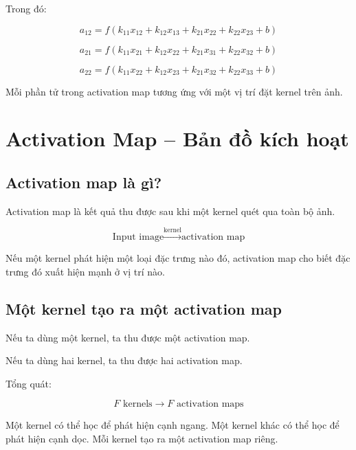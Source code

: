 Trong đó:

\[
    a_{12}
    =
    f(
    k_{11}x_{12}
    +
    k_{12}x_{13}
    +
    k_{21}x_{22}
    +
    k_{22}x_{23}
    +
    b
    )
\]

\[
    a_{21}
    =
    f(
    k_{11}x_{21}
    +
    k_{12}x_{22}
    +
    k_{21}x_{31}
    +
    k_{22}x_{32}
    +
    b
    )
\]

\[
    a_{22}
    =
    f(
    k_{11}x_{22}
    +
    k_{12}x_{23}
    +
    k_{21}x_{32}
    +
    k_{22}x_{33}
    +
    b
    )
\]

\begin{ghinho}
Mỗi phần tử trong activation map tương ứng với một vị trí đặt kernel trên ảnh.
\end{ghinho}

\section{Activation Map -- Bản đồ kích hoạt}

\subsection{Activation map là gì?}

Activation map là kết quả thu được sau khi một kernel quét qua toàn bộ ảnh.

\[
    \text{Input image}
    \xrightarrow{\text{kernel}}
    \text{activation map}
\]

Nếu một kernel phát hiện một loại đặc trưng nào đó, activation map cho biết đặc trưng đó xuất hiện mạnh ở vị trí nào.

\subsection{Một kernel tạo ra một activation map}

Nếu ta dùng một kernel, ta thu được một activation map.

Nếu ta dùng hai kernel, ta thu được hai activation map.

Tổng quát:

\[
    F \text{ kernels}
    \rightarrow
    F \text{ activation maps}
\]

\begin{vidu}
Một kernel có thể học để phát hiện cạnh ngang. Một kernel khác có thể học để phát hiện cạnh dọc. Mỗi kernel tạo ra một activation map riêng.
\end{vidu}

